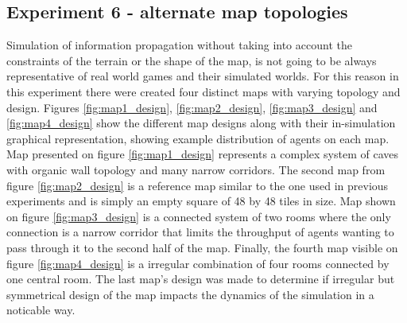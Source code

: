 \subsection{Experiment 6 - alternate map topologies}

Simulation of information propagation without taking into account the constraints of the terrain or the shape of the map, is not going to be always representative of real world games and their simulated worlds.
For this reason in this experiment there were created four distinct maps with varying topology and design.
Figures \ref{fig:map1_design}, \ref{fig:map2_design}, \ref{fig:map3_design} and \ref{fig:map4_design} show the different map designs along with their in-simulation graphical representation, showing example distribution of agents on each map.
Map presented on figure \ref{fig:map1_design} represents a complex system of caves with organic wall topology and many narrow corridors.
The second map from figure \ref{fig:map2_design} is a reference map similar to the one used in previous experiments and is simply an empty square of 48 by 48 tiles in size.
Map shown on figure \ref{fig:map3_design} is a connected system of two rooms where the only connection is a narrow corridor that limits the throughput of agents wanting to pass through it to the second half of the map.
Finally, the fourth map visible on figure \ref{fig:map4_design} is a irregular combination of four rooms connected by one central room.
The last map's design was made to determine if irregular but symmetrical design of the map impacts the dynamics of the simulation in a noticable way.

